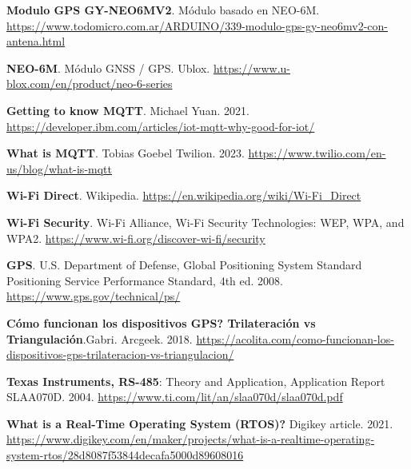 \begin{thebibliography}{30}
\textbf{Modulo GPS GY-NEO6MV2}. Módulo basado en NEO-6M. \href{https://www.todomicro.com.ar/ARDUINO/339-modulo-gps-gy-neo6mv2-con-antena.html}{https://www.todomicro.com.ar/ARDUINO/339-modulo-gps-gy-neo6mv2-con-antena.html}


\textbf{NEO-6M}. Módulo GNSS / GPS. Ublox. \href{https://www.u-blox.com/en/product/neo-6-series}{https://www.u-blox.com/en/product/neo-6-series}


\textbf{Getting to know MQTT}. Michael Yuan. 2021. \href{https://developer.ibm.com/articles/iot-mqtt-why-good-for-iot/}{https://developer.ibm.com/articles/iot-mqtt-why-good-for-iot/}

\textbf{What is MQTT}. Tobias Goebel
Twilion. 2023. \href{https://www.twilio.com/en-us/blog/what-is-mqtt}{https://www.twilio.com/en-us/blog/what-is-mqtt}


\textbf{Wi-Fi Direct}. Wikipedia. \href{https://en.wikipedia.org/wiki/Wi-Fi_Direct}{https://en.wikipedia.org/wiki/Wi-Fi\_Direct}


\textbf{Wi-Fi Security}. Wi-Fi Alliance, Wi-Fi Security Technologies: WEP, WPA, and WPA2. \href{https://www.wi-fi.org/discover-wi-fi/security}{https://www.wi-fi.org/discover-wi-fi/security}



\textbf{GPS}. U.S. Department of Defense, Global Positioning System Standard Positioning Service Performance Standard, 4th ed. 2008. \href{https://www.gps.gov/technical/ps/}{https://www.gps.gov/technical/ps/}

\textbf{Cómo funcionan los dispositivos GPS? Trilateración vs Triangulación}.Gabri. Arcgeek. 2018.  \href{https://acolita.com/como-funcionan-los-dispositivos-gps-trilateracion-vs-triangulacion/}{https://acolita.com/como-funcionan-los-dispositivos-gps-trilateracion-vs-triangulacion/}



\textbf{Texas Instruments, RS-485}: Theory and Application, Application Report SLAA070D. 2004. \href{https://www.ti.com/lit/an/slaa070d/slaa070d.pdf}{https://www.ti.com/lit/an/slaa070d/slaa070d.pdf}

\textbf{What is a Real-Time Operating System (RTOS)?} Digikey article. 2021. \href{https://www.digikey.com/en/maker/projects/what-is-a-realtime-operating-system-rtos/28d8087f53844decafa5000d89608016}{https://www.digikey.com/en/maker/projects/what-is-a-realtime-operating-system-rtos/28d8087f53844decafa5000d89608016}




\end{thebibliography}
